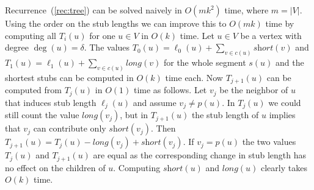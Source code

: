 \documentclass[a4paper,english,numberwithinsect]{eurocg18}
\newcommand{\maxsped}{\ensuremath{\textsc{MaxSPED}}\xspace}
\newcommand{\sollong}{\ensuremath{\textit{long}}\xspace}
\newcommand{\solshort}{\ensuremath{\textit{short}}\xspace}
\begin{document}

Recurrence~(\ref{rec:tree}) can be solved naively in $ O(mk^2) $ time, where $m = |V|$. 
Using the order on the stub lengths  we can improve this to $ O(mk) $ time by computing all $ T_i(u) $ for one $ u \in V $ in $O(k)$ time.
Let $u \in V$ be a vertex with degree $\deg(u) = \delta$. 
The values $T_0(u) = \ell_0(u) + \sum_{v\in c(u)} \solshort(v)$ and $T_1(u) = \ell_1(u) + \sum_{v\in c(u)} \sollong(v)$ for the whole segment $s(u)$ and the shortest stubs can be computed in $O(k)$ time each.
Now $T_{j+1}(u)$ can be computed from $T_j(u)$ in $O(1)$ time as follows.
Let $v_j $ be the neighbor of $u$ that induces stub length $\ell_j(u)$ and assume $v_j \ne p(u)$.
In $T_j(u)$ we could still count the value $\sollong(v_j)$, but in $T_{j+1}(u)$ the stub length of $u$ implies that $v_j$ can contribute only $\solshort(v_j)$. 
Then $T_{j+1}(u) = T_j(u) - \sollong(v_j) + \solshort(v_j)$.
If $v_j=p(u)$ the two values $T_j(u)$ and $T_{j+1}(u)$ are equal as the corresponding change in stub length has no effect on the children of $u$.
Computing $\solshort(u)$ and $\sollong(u)$ clearly takes $O(k)$ time.
\end{document}
